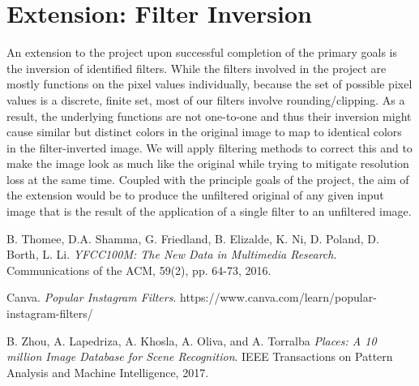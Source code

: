 \documentclass[a4paper, 11pt]{article}
\begin{document}
\section*{Extension: Filter Inversion}
An extension to the project upon successful completion of the primary goals is the inversion of identified filters. While the filters involved in the project are mostly functions on the pixel values individually, because the set of possible pixel values is a discrete, finite set, most of our filters involve rounding/clipping. As a result, the underlying functions are not one-to-one and thus their inversion might cause similar but distinct colors in the original image to map to identical colors in the filter-inverted image. We will apply filtering methods to correct this and to make the image look as much like the original while trying to mitigate resolution loss at the same time. Coupled with the principle goals of the project, the aim of the extension would be to produce the unfiltered original of any given input image that is the result of the application of a single filter to an unfiltered image.

\begin{thebibliography}{9}
 B. Thomee, D.A. Shamma, G. Friedland, B. Elizalde, K. Ni, D. Poland, D. Borth, L. Li. \emph{YFCC100M: The New Data in Multimedia Research}. Communications of the ACM, 59(2), pp. 64-73, 2016.

 Canva. \emph{Popular Instagram Filters}. https://www.canva.com/learn/popular-instagram-filters/

 B. Zhou, A. Lapedriza, A. Khosla, A. Oliva, and A. Torralba \emph{Places: A 10 million Image Database for Scene Recognition}. IEEE Transactions on Pattern Analysis and Machine Intelligence, 2017.

\end{thebibliography}
\end{document}
